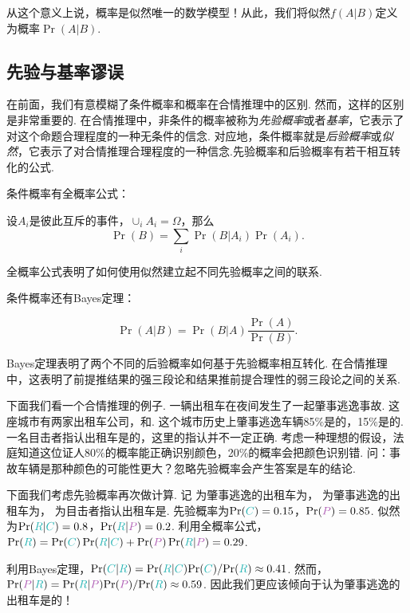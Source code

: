 从这个意义上说，概率是似然唯一的数学模型！从此，我们将似然$f(A|B)$定义为概率$\Pr(A|B)$.

\subsection{先验与基率谬误}

在前面，我们有意模糊了条件概率和概率在合情推理中的区别. 然而，这样的区别是非常重要的. 在合情推理中，非条件的概率被称为\textit{先验概率}或者\textit{基率}，它表示了对这个命题合理程度的一种无条件的信念. 对应地，条件概率就是\textit{后验概率}或\textit{似然}，它表示了对合情推理合理程度的一种信念.先验概率和后验概率有若干相互转化的公式.

条件概率有全概率公式：
\begin{theorem}[全概率公式]
设$A_i$是彼此互斥的事件，$\cup_i A_i=\Omega$，那么
    \[\Pr(B)=\sum_{i}\Pr(B|A_i)\Pr(A_i).\]
\end{theorem}
全概率公式表明了如何使用似然建立起不同先验概率之间的联系.

条件概率还有Bayes定理：
\begin{theorem}[Bayes定理]
    \[\Pr(A|B) = \Pr(B|A)\frac{\Pr(A)}{\Pr(B)}.\]
\end{theorem}
 Bayes定理表明了两个不同的后验概率如何基于先验概率相互转化. 在合情推理中，这表明了前提推结果的强三段论和结果推前提合理性的弱三段论之间的关系.

下面我们看一个合情推理的例子. 一辆出租车在夜间发生了一起肇事逃逸事故. 这座城市有两家出租车公司，和. 这个城市历史上肇事逃逸车辆85\%是的，15\%是的. 一名目击者指认出租车是的，这里的指认并不一定正确. 考虑一种理想的假设，法庭知道这位证人80\%的概率能正确识别颜色，20\%的概率会把颜色识别错. 问：事故车辆是那种颜色的可能性更大？忽略先验概率会产生答案是车的结论. 

下面我们考虑先验概率再次做计算. 记  为肇事逃逸的出租车为， 为肇事逃逸的出租车为， 为目击者指认出租车是. 先验概率为$\Pr(\contrastlight{C}) = 0.15$，$\Pr(\light{P}) = 0.85$. 似然为$\Pr(\contrastlight{R}|\contrastlight{C}) = 0.8$，$\Pr(\contrastlight{R}|\light{P}) = 0.2$. 利用全概率公式，$\Pr(\contrastlight{R}) = \Pr(\contrastlight{C})\Pr(\contrastlight{R}|\contrastlight{C}) + \Pr(\light{P})\Pr(\contrastlight{R}|\light{P}) = 0.29$. 
 
利用Bayes定理，$\Pr(\contrastlight{C}|\contrastlight{R}) = \Pr(\contrastlight{R}|\contrastlight{C}){\Pr(\contrastlight{C})}/{\Pr(\contrastlight{R})} \approx 0.41$. 然而，$\Pr(\light{P}|\contrastlight{R}) = \Pr(\contrastlight{R}|\light{P}){\Pr(\light{P})}/{\Pr(\contrastlight{R})} \approx 0.59$. 因此我们更应该倾向于认为肇事逃逸的出租车是的！

